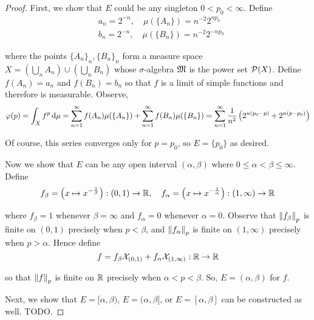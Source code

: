 \begin{proof}
     First, we show that \(E\) could be any singleton \(0 < p_0 < \infty\). Define 
    \begin{align*}
        & a_n = 2^{-n}, \quad \mu(\{A_n\}) = n^{-2} 2^{np_0}  \\
        & b_n = 2^{-n}, \quad \mu(\{B_n\}) = n^{-2} 2^{-np_0}
    \end{align*}

    where the points \(\{A_n\}_n, \{B_n\}_n\) form a measure space \(X = \left(\bigcup_n A_n\right) \cup \left(\bigcup_n B_n\right)\) whose \(\sigma\)-algebra \(\mathfrak{M}\) is the power set \(\mathcal{P}(X)\). Define \(f(A_n) = a_n\) and \(f(B_n) = b_n\) so that \(f\) is a limit of simple functions and therefore is measurable. Observe, 
    \[
        \varphi(p) = \int_X f^p \, \mathrm{d}\mu = \sum_{n=1}^\infty f(A_n) \mu(\{A_n\}) + \sum_{n=1}^\infty f(B_n) \mu(\{B_n\})
        = \sum_{n=1}^\infty \frac{1}{n^2} \left( 2^{n(p_0 - p)} + 2^{n(p - p_0)} \right)
    \]

    Of course, this series converges only for \(p = p_0\), so \(E = \{p_0\}\) as desired. 
    \stdvspace

    Now we show that \(E\) can be any open interval \((\alpha, \beta)\) where \(0 \leq \alpha < \beta \leq \infty\). Define
    \[
        f_\beta = \left(x \mapsto x^{-\frac{1}{\beta}}\right) : (0,1) \to \mathbb{R}, 
        \quad 
        f_\alpha = \left(x \mapsto x^{-\frac{1}{\alpha}}\right) : (1,\infty) \to \mathbb{R}
    \]
    
    where \(f_\beta = 1\) whenever \(\beta = \infty\) and \(f_\alpha = 0\) whenever \(\alpha = 0\). Observe that \(\norm{f_\beta}_p\) is finite on \((0,1)\) precisely when \(p < \beta\), and \(\norm{f_\alpha}_p\) is finite on \((1, \infty)\) precisely when \(p > \alpha\). Hence define 
    \[
        f = f_\beta \mathcal{X}_{(0,1)} + f_\alpha \mathcal{X}_{(1, \infty)} : \mathbb{R} \to \mathbb{R}
    \]

    so that \(\norm{f}_p\) is finite on \(\mathbb{R}\) precisely when \(\alpha < p < \beta\). So, \(E = (\alpha, \beta)\) for \(f\). 
    \stdvspace

    Next, we show that \(E = [\alpha, \beta)\), \(E = (\alpha, \beta]\), or \(E = [\alpha, \beta]\) can be constructed as well. TODO. 
\end{proof}

